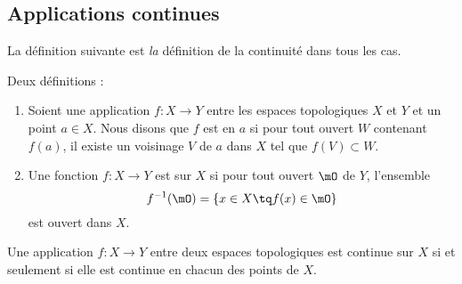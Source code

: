 \subsection{Applications continues}

La définition suivante est \emph{la} définition de la continuité dans tous les cas.
\begin{definition}\label{DefOLNtrxB}
	Deux définitions :
	\begin{enumerate}
		\item   \label{ITEMooXARPooNzsWLr}
		      Soient une application \( f\colon X\to Y\) entre les espaces topologiques \( X\) et \( Y\) et un point \( a\in X\). Nous disons que \( f\) est  en \( a\) si pour tout ouvert \( W\) contenant \( f(a)\), il existe un voisinage \( V\) de \( a\) dans \( X\) tel que \( f(V)\subset W\).
		\item       \label{ITEMooEHGWooDdITRV}
		      Une fonction \( f\colon X\to Y\) est  sur \( X\) si pour tout ouvert \( \mO\) de \( Y\), l'ensemble
		      \begin{equation}      \label{defFminus1ofaset}
			      f^{-1}(\mO) = \{ x \in X \tq f(x) \in \mO\}
		      \end{equation}
		      est ouvert dans \( X\).
	\end{enumerate}
\end{definition}

\begin{proposition}		\label{PROPooOVKEooCkJmmO}
	Une application \(f \colon X\to Y  \) entre deux espaces topologiques est continue sur \( X\) si et seulement si elle est continue en chacun des points de \( X\).
\end{proposition}

